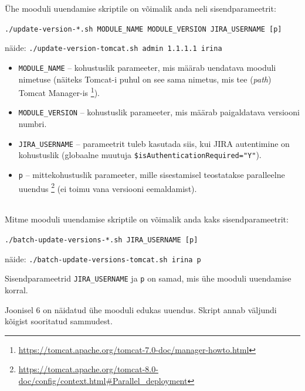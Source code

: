 \documentclass[12pt]{article}
\newcommand{\code}[1]{\texttt{#1}}
\begin{document}
  Ühe mooduli uuendamise skriptile on võimalik anda neli sisendparameetrit:
  \begin{center}
    \small{\code{./update-version-*.sh MODULE\_NAME MODULE\_VERSION JIRA\_USERNAME [p]}}
  \end{center}

  \begin{center}
    \small{näide: \code{./update-version-tomcat.sh admin 1.1.1.1 irina}}
  \end{center}

  \begin{itemize}
    \item \code{MODULE\_NAME} \--- kohustuslik parameeter, mis määrab uendatava mooduli nimetuse (näiteks Tomcat-i puhul on see sama nimetus, mis tee (\textit{path}) Tomcat Manager-is \footnote{\url{https://tomcat.apache.org/tomcat-7.0-doc/manager-howto.html}}).
    \item \code{MODULE\_VERSION} \--- kohustuslik parameeter, mis määrab paigaldatava versiooni numbri.
    \item \code{JIRA\_USERNAME} \--- parameetrit tuleb kasutada siis, kui JIRA autentimine on kohustuslik (globaalne muutuja \code{\$isAuthenticationRequired="Y"}).
    \item \code{p} \--- mittekohustuslik parameeter, mille sisestamisel teostatakse paralleelne uuendus \footnote{\url{https://tomcat.apache.org/tomcat-8.0-doc/config/context.html\#Parallel\_deployment}} (ei toimu vana versiooni eemaldamist).
  \end{itemize}\\
  
  Mitme mooduli uuendamise skriptile on võimalik anda kaks sisendparameetrit:
  
  \begin{center}
    \small{\code{./batch-update-versions-*.sh JIRA\_USERNAME [p]}}
  \end{center}
  
  \begin{center}
    \small{näide: \code{./batch-update-versions-tomcat.sh irina p}}
  \end{center}
  
    Sisendparameetrid \code{JIRA\_USERNAME} ja \code{p} on samad, mis ühe mooduli uuendamise korral.
  
  Joonisel 6 on näidatud ühe mooduli edukas uuendus. Skript annab väljundi kõigist sooritatud sammudest.
  
\end{document}
